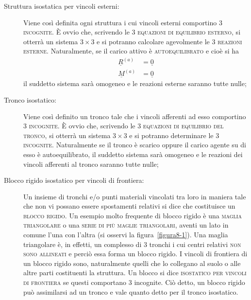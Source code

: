 \begin{description}
\item[Struttura isostatica per vincoli esterni:] Viene così definita ogni struttura i cui vincoli esterni comportino $3$ \textsc{incognite}. È ovvio che, scrivendo le $3$ \textsc{equazioni di equilibrio esterno}, si otterrà un sistema $3\times 3$ e si potranno calcolare agevolmente le $3$ \textsc{reazioni esterne}. Naturalmente, se il carico attivo è \textsc{autoequilibrato} e cioè si ha
\begin{align*}
\underline{R}^{(a)} &= \underline{0} \\
\underline{M}^{(a)} &= \underline{0}
\end{align*}
il suddetto sistema sarà omogeneo e le reazioni esterne saranno tutte nulle;
\item[Tronco isostatico:] Viene così definito un tronco tale che i vincoli afferenti ad esso comportino $3$ \textsc{incognite}. È ovvio che, scrivendo le $3$ \textsc{equazioni di equilibrio del tronco}, si otterrà un sistema $3\times 3$ e si potranno determinare le $3$ \textsc{incognite}. Naturalmente se il tronco è scarico oppure il carico agente su di esso è autoequilibrato, il suddetto sistema sarà omogeneo e le reazioni dei vincoli afferenti al tronco saranno tutte nulle;
\item[Blocco rigido isostatico per vincoli di frontiera:] Un insieme di tronchi e/o punti materiali vincolati tra loro in maniera tale che non vi possano essere spostamenti relativi si dice che costituisce un \textsc{blocco rigido}. Un esempio molto frequente di blocco rigido è una \textsc{maglia triangolare} o una \textsc{serie di più maglie triangolari}, aventi un lato in comune l'una con l'altra (si osservi la figura~\ref{figura8-1}). Una maglia triangolare è, in effetti, un complesso di $3$ tronchi i cui centri relativi \textsc{non sono allineati} e perciò essa forma un blocco rigido. I vincoli di frontiera di un blocco rigido sono, naturalmente quelli che lo collegano al suolo o alle altre parti costituenti la struttura. Un blocco si dice \textsc{isostatico per vincoli di frontiera} se questi comportano $3$ incognite. Ciò detto, un blocco rigido può assimilarsi ad un tronco e vale quanto detto per il tronco isostatico. 

\end{description}
